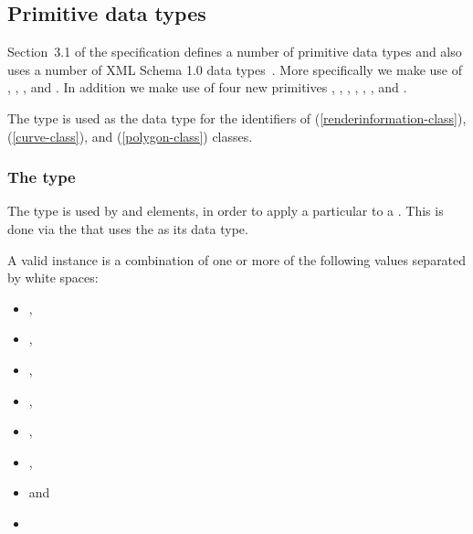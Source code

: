 \subsection{Primitive data types}
\label{primtypes}
\label{primitive-types}


Section~3.1 of the \sbmlthreecore specification defines a number of primitive
data types and also uses a number of XML Schema 1.0 data types~\citep{biron:2000}.
More specifically we make use of , ,
,  and . 
In addition we make use of
four new primitives , , 
, , ,  
,  and .

The  type is used as the data type for the identifiers of \RenderInformation
(\ref{renderinformation-class}), \Curve (\ref{curve-class}),  and \Polygon
(\ref{polygon-class}) classes. 

\subsubsection{The  type}
\label{style-type}
The type  is used by \LocalStyle and \GlobalStyle elements, in order
to apply a particular \Style to a \GraphicalObject. This is done via the 
that uses the  as its data type. 

A valid  instance is a combination of one or more of the following 
values separated by white spaces:

\begin{itemize}
 \item {},
 \item {},
 \item {}, 
 \item {},
 \item {}, 
 \item {}, 
 \item {} and 
 \item {}
\end{itemize}


